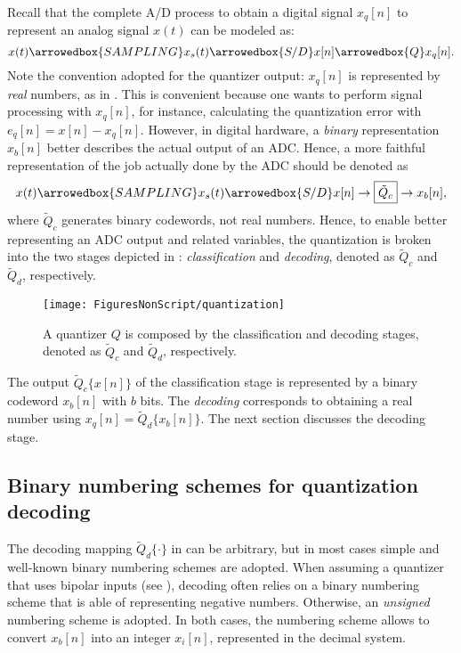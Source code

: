 Recall that the complete A/D process to obtain a digital signal $x_q[n]$ to represent an analog signal $x(t)$ can be modeled as:
\[
x(t) \arrowedbox{SAMPLING} x_s(t) \arrowedbox{S/D} x[n] \arrowedbox{Q} x_q[n].
\]
Note the convention adopted for the quantizer output: $x_q[n]$ is represented by \emph{real} numbers, as in .
This is convenient because one wants to perform signal processing with $x_q[n]$, for instance, calculating the quantization error with $e_q[n]=x[n]-x_q[n]$.
However, in digital hardware, a \emph{binary} representation $x_b[n]$ better describes the actual output of an ADC. 
Hence, a more faithful representation of the job actually done by the ADC should be denoted as
\[
x(t) \arrowedbox{SAMPLING} x_s(t) \arrowedbox{S/D} x[n] \rightarrow\boxed{\tilde{Q}_c}\rightarrow x_b[n],
\]
where $\tilde{Q}_c$ generates binary codewords, not real numbers. 
Hence, to
enable better representing an ADC output and related variables,
the quantization is broken into the two stages depicted in : \emph{classification} and \emph{decoding}, denoted as $\tilde Q_c$ and $\tilde Q_d$, respectively.

\begin{figure}
	\centering
		\texttt{[image: FiguresNonScript/quantization]}
	\caption{A quantizer $Q$ is composed by the classification and decoding stages, denoted as $\tilde Q_c$ and $\tilde Q_d$, respectively.\label{fig:quantizers}}
\end{figure}

The output $\tilde Q_c \{ x[n] \}$
of the classification stage is represented by a binary codeword $x_b[n]$ with $b$ bits.
The \emph{decoding} corresponds to obtaining a
real number using $x_q[n] = \tilde Q_d \{ x_b[n] \}$.
The next section discusses the decoding stage.


\subsection{Binary numbering schemes for quantization decoding}

The decoding mapping $\tilde Q_d \{ \cdot \}$ in  can be arbitrary, but in most cases simple and well-known binary numbering schemes are adopted.
When assuming a quantizer that uses bipolar inputs (see ), decoding often relies on a
binary numbering scheme that is able of representing negative numbers. Otherwise, an \emph{unsigned} numbering scheme is adopted.
In both cases, the numbering scheme allows to convert $x_b[n]$ into an integer $x_i[n]$, represented in the decimal system.

